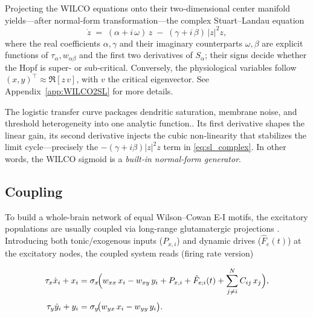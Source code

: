 \documentclass[12pt]{article}
\numberwithin{equation}{section}
\begin{document}
Projecting the WILCO equations onto their two‑dimensional center manifold yields—after normal‑form transformation—the complex Stuart–Landau equation
\cite{pietras2019network}
\begin{equation}
\dot{z} \;=\; (\alpha + i\,\omega)\,z \;-\; (\gamma + i\,\beta)\,\lvert z\rvert^{2}z,
\label{eq:sl_complex}
\end{equation}
where the real coefficients \(\alpha,\gamma\) and their imaginary counterparts \(\omega,\beta\) are explicit functions of \(\tau_{\alpha},w_{\alpha\beta}\) and the first two derivatives of \(S_{\alpha}\); their signs decide whether the Hopf is super‑ or sub‑critical.
Conversely, the physiological variables follow $(x,y)^\top \approx \Re[z\,v]$, with $v$ the critical eigenvector. See Appendix~\ref{app:WILCO2SL} for more details.

The logistic transfer curve packages dendritic saturation, membrane noise, and threshold heterogeneity into one analytic function.\cite{deco_dynamic_2008}. 
Its first derivative shapes the linear gain, its second derivative injects the cubic non‑linearity that stabilizes the limit cycle—precisely the \(-(\gamma+i\beta)|z|^{2}z\) term in \eqref{eq:sl_complex}.  In other words, the WILCO sigmoid is a \emph{built‑in normal‑form generator}.



\subsection{Coupling}

To build a whole-brain network of equal Wilson–Cowan E-I  motifs,  the excitatory populations are usually coupled via long-range glutamatergic projections \cite{castaldo2023multi}.  Introducing both tonic/exogenous inputs ($P_{x,i}$) and dynamic drives ($\hat F_e(t)$) at the excitatory nodes, the coupled system reads (firing rate version)
\begin{tcolorbox}[
  colback=gray!5,
  colframe=gray!5, %
  boxrule=0pt,
  enhanced, sharp corners,
  left=4pt, right=4pt, top=3pt, bottom=3pt,
  boxsep=2pt,
  before skip=6pt, after skip=6pt
]
\begin{equation} 
\begin{aligned}
  \tau_x \dot{x}_i + x_i 
    &= \sigma_x\!\Bigl(
         w_{xx}\,x_i 
       - w_{xy}\,y_i 
        + P_{x,i} 
       + \hat F_{e;i}(t) + \sum_{j\neq i }^N C_{ij}\,x_j\Bigr)
       ,
  \label{eq:WILCO_net_x}\\[4pt]
  \tau_y \dot{y}_i + y_i 
    &= \sigma_y\!\bigl(
         w_{yx}\,x_i 
       - w_{yy}\,y_i
       \bigr).
\end{aligned}
\end{equation}
\end{tcolorbox}
\end{document}
